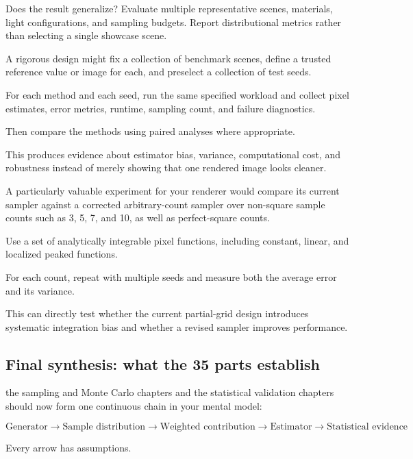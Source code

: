 Does the result generalize? Evaluate multiple representative scenes, materials, light configurations, and sampling budgets. Report distributional metrics rather than selecting a single showcase scene.

A rigorous design might fix a collection of benchmark scenes, define a trusted reference value or image for each, and preselect a collection of test seeds.

For each method and each seed, run the same specified workload and collect pixel estimates, error metrics, runtime, sampling count, and failure diagnostics.

Then compare the methods using paired analyses where appropriate.

This produces evidence about estimator bias, variance, computational cost, and robustness instead of merely showing that one rendered image looks cleaner.

A particularly valuable experiment for your renderer would compare its current sampler against a corrected arbitrary-count sampler over non-square sample counts such as 3, 5, 7, and 10, as well as perfect-square counts.

Use a set of analytically integrable pixel functions, including constant, linear, and localized peaked functions.

For each count, repeat with multiple seeds and measure both the average error and its variance.

This can directly test whether the current partial-grid design introduces systematic integration bias and whether a revised sampler improves performance.

\subsection{Final synthesis: what the 35 parts establish}\label{02-foundations-ii-ch031-final-synthesis-what-the-35-parts-establish}

\hypertarget{02-foundations-ii-ch031-final-synthesis-what-the-35-parts-establish}{}

the sampling and Monte Carlo chapters and the statistical validation chapters should now form one continuous chain in your mental model:

\[
 \boxed{ \text{Generator} \rightarrow \text{Sample distribution} \rightarrow \text{Weighted contribution} \rightarrow \text{Estimator} \rightarrow \text{Statistical evidence} }
\]

Every arrow has assumptions.

